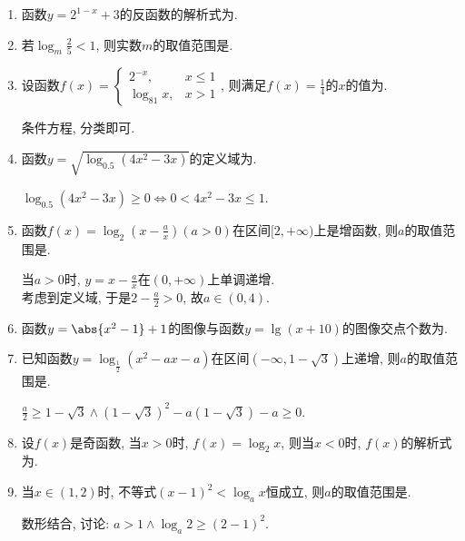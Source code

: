\begin{enumerate}
\item 函数$y=2^{1-x}+3$的反函数的解析式为. 

\item 若$\log_m\frac{2}{5}<1$, 则实数$m$的取值范围是. 

\item 设函数$f(x)=\begin{cases}
2^{-x}, & x\leq 1\\
\log_{81}x, & x>1
\end{cases}$, 
则满足$f(x)=\frac{1}{4}$的$x$的值为. 
\begin{jieda}
条件方程, 分类即可. 
\end{jieda}


\item 函数$y=\sqrt{\log_{0.5}(4x^2-3x)}$的定义域为. 
\begin{jieda}
$\log_{0.5}(4x^2-3x)\geq0\iff 0<4x^2-3x\leq 1$. 
\end{jieda}


\item 函数$f(x)=\log_2\left(x-\frac{a}{x}\right)(a>0)$在区间$[2,+\infty)$上是增函数, 则$a$的取值范围是. 
\begin{jieda}
当$a>0$时, $y=x-\frac{a}{x}$在$(0,+\infty)$上单调递增. \\
考虑到定义域, 于是$2-\frac{a}{2}>0$, 故$a\in(0,4)$. 
\end{jieda}


\item 函数$y=\abs{x^2-1}+1$的图像与函数$y=\lg(x+10)$的图像交点个数为. 



\item 已知函数$y=\log_{\frac{1}{2}}(x^2-ax-a)$在区间$(-\infty,1-\sqrt{3})$上递增, 则$a$的取值范围是\blkda{$[2-2\sqrt{3},2]$}. 
\begin{jieda}
$\frac{a}{2}\geq 1-\sqrt{3}\land (1-\sqrt{3})^2-a(1-\sqrt{3})-a\geq 0$. 
\end{jieda}

\item 设$f(x)$是奇函数, 当$x>0$时, $f(x)=\log_2{x}$, 则当$x<0$时, $f(x)$的解析式为. 

\item 当$x\in(1,2)$时, 不等式$(x-1)^2<\log_ax$恒成立, 则$a$的取值范围是\blkda{$(1,2]$}. 
\begin{jieda}
数形结合, 讨论: $a>1\land \log_a2\geq (2-1)^2$. 
\end{jieda}



\end{enumerate}
